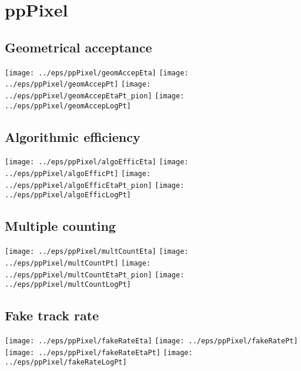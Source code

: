 \documentclass[landscape]{article}
\begin{document}
\section{ppPixel}

\subsection{Geometrical acceptance}
 \texttt{[image: ../eps/ppPixel/geomAccepEta]}
 \texttt{[image: ../eps/ppPixel/geomAccepPt]}
 \texttt{[image: ../eps/ppPixel/geomAccepEtaPt\_pion]}
 \texttt{[image: ../eps/ppPixel/geomAccepLogPt]}
 \newpage
 
\subsection{Algorithmic efficiency}
 \texttt{[image: ../eps/ppPixel/algoEfficEta]}
 \texttt{[image: ../eps/ppPixel/algoEfficPt]}
 \texttt{[image: ../eps/ppPixel/algoEfficEtaPt\_pion]}
 \texttt{[image: ../eps/ppPixel/algoEfficLogPt]}
 \newpage

\subsection{Multiple counting}
 \texttt{[image: ../eps/ppPixel/multCountEta]}
 \texttt{[image: ../eps/ppPixel/multCountPt]}
 \texttt{[image: ../eps/ppPixel/multCountEtaPt\_pion]}
 \texttt{[image: ../eps/ppPixel/multCountLogPt]}
 \newpage

\subsection{Fake track rate}
 \texttt{[image: ../eps/ppPixel/fakeRateEta]}
 \texttt{[image: ../eps/ppPixel/fakeRatePt]}
 \texttt{[image: ../eps/ppPixel/fakeRateEtaPt]}
 \texttt{[image: ../eps/ppPixel/fakeRateLogPt]}
 \newpage
\end{document}
